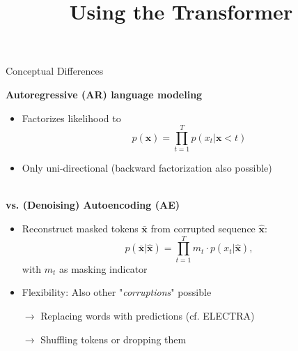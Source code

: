 



\newcommand{\titlefigure}{figure/sesamestreet.jpeg}
\newcommand{\learninggoals}{
\item Understand the improvements over BERT
\item Permutation language modeling}

\title{Using the Transformer}
\date{}




\begin{frame}{Conceptual Differences}

\vfill

	\textbf{Autoregressive (AR) language modeling}
	
	\begin{itemize}
		\item Factorizes likelihood to $$p(\mathbf{x}) = \prod_{t=1}^{T} p(x_t | \mathbf{x}{< t})$$
		\item Only uni-directional (backward factorization also possible)
	\end{itemize}

	\textbf{}\\

	\textbf{vs. (Denoising) Autoencoding (AE)}
	
	\begin{itemize}
		\item Reconstruct masked tokens $\bar{\mathbf{x}}$ from corrupted sequence $\hat{\mathbf{x}}$:
					$$p(\bar{\mathbf{x}}|\hat{\mathbf{x}}) = \prod_{t=1}^{T} m_t \cdot p(x_t | \hat{\mathbf{x}}),$$ with $m_t$ as masking indicator
		\item Flexibility: Also other "\textit{corruptions}" possible
		\item[$\to$] Replacing words with predictions (cf. ELECTRA)
		\item[$\to$] Shuffling tokens or dropping them
	\end{itemize}
	
\vfill

\end{frame}

